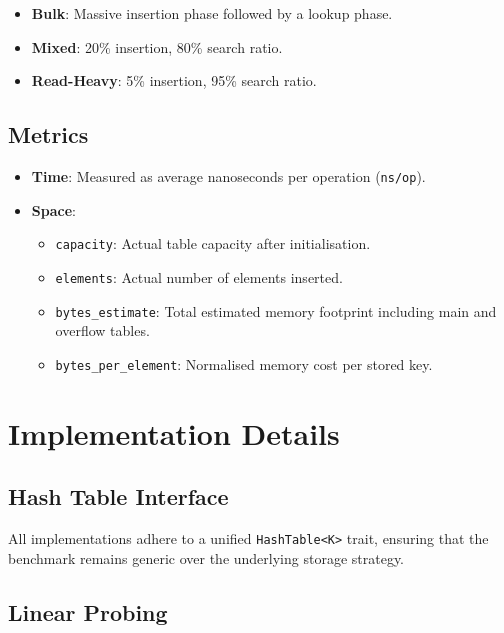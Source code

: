 \documentclass[11pt,a4paper]{article}
\begin{document}
\begin{itemize}
  \item \textbf{Bulk}: Massive insertion phase followed by a lookup phase.
  \item \textbf{Mixed}: 20\% insertion, 80\% search ratio.
  \item \textbf{Read-Heavy}: 5\% insertion, 95\% search ratio.
\end{itemize}

\subsection{Metrics}

\begin{itemize}
  \item \textbf{Time}: Measured as average nanoseconds per operation (\texttt{ns/op}).
  \item \textbf{Space}:
    \begin{itemize}
      \item \texttt{capacity}: Actual table capacity after initialisation.
      \item \texttt{elements}: Actual number of elements inserted.
      \item \texttt{bytes\_estimate}: Total estimated memory footprint including main and overflow tables.
      \item \texttt{bytes\_per\_element}: Normalised memory cost per stored key.
    \end{itemize}
\end{itemize}

\section{Implementation Details}

\subsection{Hash Table Interface}

All implementations adhere to a unified \texttt{HashTable<K>} trait, ensuring that the benchmark remains generic over the underlying storage strategy.

\subsection{Linear Probing}
\end{document}
